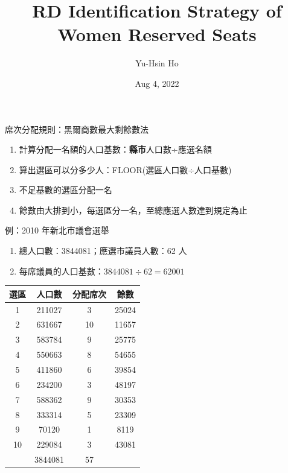 \documentclass[
  10pt,
  ignorenonframetext,
  aspectratio=43,
]{beamer}
\title{RD Identification Strategy of Women Reserved Seats}
\author{Yu-Hsin Ho}
\date{Aug 4, 2022}
\institute{Department of Economics, National Taiwan University}
\providecommand{\tightlist}{%
  \setlength{\itemsep}{0pt}\setlength{\parskip}{0pt}}
\begin{document}
\frame{\titlepage}

\begin{frame}{席次分配規則：黑爾商數最大剩餘數法}
\protect\hypertarget{ux5e2dux6b21ux5206ux914dux898fux5247ux9ed1ux723eux5546ux6578ux6700ux5927ux5269ux9918ux6578ux6cd5}{}
\begin{enumerate}
\tightlist
\item
  計算分配一名額的人口基數：\textbf{縣市}人口數÷應選名額
\item
  算出選區可以分多少人：FLOOR(選區人口數÷人口基數)
\item
  不足基數的選區分配一名
\item
  餘數由大排到小，每選區分一名，至總應選人數達到規定為止
\end{enumerate}
\end{frame}

\begin{frame}
\begin{block}{例：2010 年新北市議會選舉}
\protect\hypertarget{ux4f8b2010-ux5e74ux65b0ux5317ux5e02ux8b70ux6703ux9078ux8209}{}
\begin{enumerate}
\tightlist
\item
  總人口數：3844081；應選市議員人數：62 人
\item
  每席議員的人口基數：\(3844081 \div 62 = 62001\)
\end{enumerate}

\begin{longtable}[]{@{}cccc@{}}
\toprule()
選區 & 人口數 & 分配席次 & 餘數 \\
\midrule()
\endhead
1 & 211027 & 3 & 25024 \\
2 & 631667 & 10 & 11657 \\
3 & 583784 & 9 & 25775 \\
4 & 550663 & 8 & 54655 \\
5 & 411860 & 6 & 39854 \\
6 & 234200 & 3 & 48197 \\
7 & 588362 & 9 & 30353 \\
8 & 333314 & 5 & 23309 \\
9 & 70120 & 1 & 8119 \\
10 & 229084 & 3 & 43081 \\
& 3844081 & 57 & \\
\bottomrule()
\end{longtable}
\end{block}
\end{frame}
\end{document}
